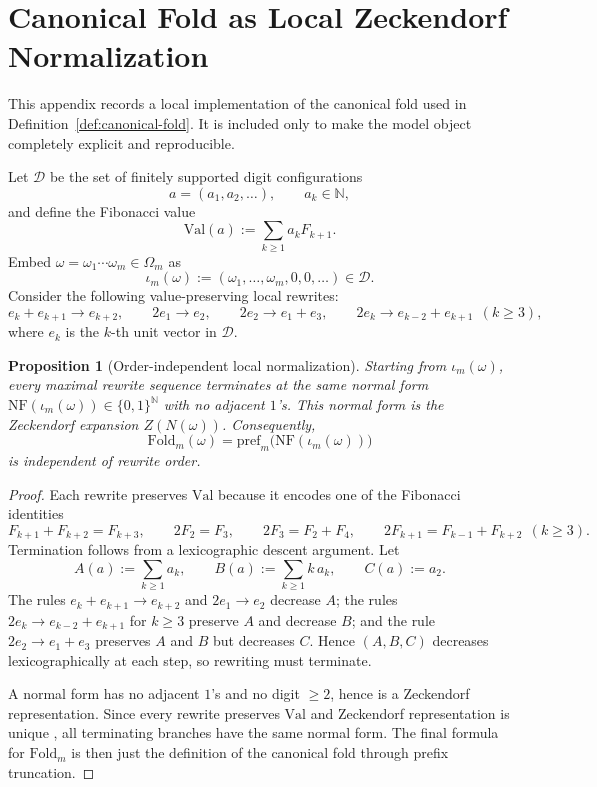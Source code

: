 \documentclass[11pt,letterpaper]{article}
\numberwithin{equation}{section}
\theoremstyle{plain}
\newtheorem{proposition}[theorem]{Proposition}
\theoremstyle{definition}
\theoremstyle{remark}
\newcommand{\Fold}{\mathrm{Fold}}
\newcommand{\pref}{\mathrm{pref}}
\begin{document}
\appendix

\section{Canonical Fold as Local Zeckendorf Normalization}\label{app:canonical-fold}

This appendix records a local implementation of the canonical fold used in
Definition~\ref{def:canonical-fold}. It is included only to make the model
object completely explicit and reproducible.

Let \(\mathcal{D}\) be the set of finitely supported digit configurations
\[
a=(a_1,a_2,\dots),\qquad a_k\in\mathbb{N},
\]
and define the Fibonacci value
\[
\mathrm{Val}(a):=\sum_{k\ge 1} a_k F_{k+1}.
\]
Embed \(\omega=\omega_1\cdots \omega_m\in\Omega_m\) as
\[
\iota_m(\omega):=(\omega_1,\dots,\omega_m,0,0,\dots)\in\mathcal{D}.
\]
Consider the following value-preserving local rewrites:
\[
e_k+e_{k+1}\to e_{k+2},
\qquad
2e_1\to e_2,
\qquad
2e_2\to e_1+e_3,
\qquad
2e_k\to e_{k-2}+e_{k+1}\ \ (k\ge 3),
\]
where \(e_k\) is the \(k\)-th unit vector in \(\mathcal{D}\).

\begin{proposition}[Order-independent local normalization]\label{prop:canonical-fold-rewrite}
Starting from \(\iota_m(\omega)\), every maximal rewrite sequence terminates at
the same normal form \(\mathrm{NF}(\iota_m(\omega))\in\{0,1\}^{\mathbb{N}}\)
with no adjacent \(1\)'s. This normal form is the Zeckendorf expansion
\(Z(N(\omega))\). Consequently,
\[
\Fold_m(\omega)=\pref_m\bigl(\mathrm{NF}(\iota_m(\omega))\bigr)
\]
is independent of rewrite order.
\end{proposition}

\begin{proof}
Each rewrite preserves \(\mathrm{Val}\) because it encodes one of the Fibonacci
identities
\[
F_{k+1}+F_{k+2}=F_{k+3},
\qquad
2F_2=F_3,
\qquad
2F_3=F_2+F_4,
\qquad
2F_{k+1}=F_{k-1}+F_{k+2}\ \ (k\ge 3).
\]
Termination follows from a lexicographic descent argument. Let
\[
A(a):=\sum_{k\ge 1} a_k,
\qquad
B(a):=\sum_{k\ge 1} k\,a_k,
\qquad
C(a):=a_2.
\]
The rules \(e_k+e_{k+1}\to e_{k+2}\) and \(2e_1\to e_2\) decrease \(A\); the
rules \(2e_k\to e_{k-2}+e_{k+1}\) for \(k\ge 3\) preserve \(A\) and decrease
\(B\); and the rule \(2e_2\to e_1+e_3\) preserves \(A\) and \(B\) but decreases
\(C\). Hence \((A,B,C)\) decreases lexicographically at each step, so rewriting
must terminate.

A normal form has no adjacent \(1\)'s and no digit \(\ge 2\), hence is a
Zeckendorf representation. Since every rewrite preserves \(\mathrm{Val}\) and
Zeckendorf representation is unique \cite{Zeckendorf1972}, all terminating
branches have the same normal form. The final formula for \(\Fold_m\) is then
just the definition of the canonical fold through prefix truncation.
\end{proof}



\end{document}
